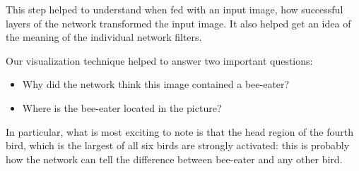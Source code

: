 This step helped to understand when fed with an input image, how successful layers of the network transformed the input image. It also helped get an idea of the meaning of the individual network filters.

Our visualization technique helped to answer two important questions:

\begin{itemize}
\item  Why did the network think this image contained a bee-eater?
\item Where is the bee-eater located in the picture?
\end{itemize}

In particular, what is most exciting to note is that the head region of the fourth bird, which is the largest of all six birds are strongly activated: this is probably how the network can tell the difference between bee-eater and any other bird.

